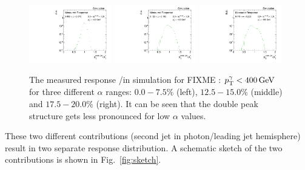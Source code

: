 \begin{figure}[bt]
 \centering
     \includegraphics[width=0.32\textwidth]{figures/resolution/methodology/fullResponse_1_alpha_bin.pdf}
     \includegraphics[width=0.32\textwidth]{figures/resolution/methodology/fullResponse_4_alpha_bin.pdf}
     \includegraphics[width=0.32\textwidth]{figures/resolution/methodology/fullResponse_6_alpha_bin.pdf}
  \caption{The measured response \ptrecojet/\ptgamma in simulation for FIXME : ${p}_\mathrm{T}^{\gamma} < 400 \,\text{Ge}\kern-0.06667em\text{V}$ for three different $\alpha$ ranges: $0.0-7.5\%$ (left), $12.5-15.0\%$ (middle) and $17.5-20.0\%$ (right). 
           It can be seen that the double peak structure gets less pronounced for low $\alpha$ values.}  
 \label{fig:alphaBins}
\end{figure}

These two different contributions (second jet in photon/leading jet hemisphere) result in two separate response distribution.
A schematic sketch of the two contributions is shown in Fig.~\ref{fig:sketch}. 



